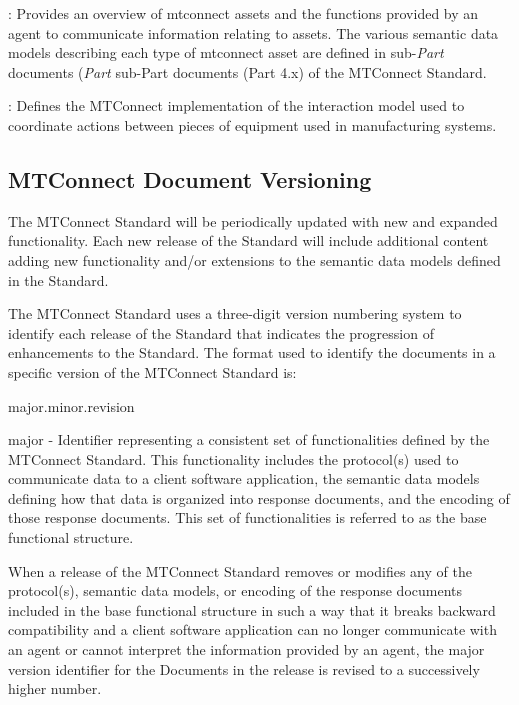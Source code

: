 \documentclass{mtconnect}	%
\providecommand{\DIFadd}[1]{{\hspace{0pt}\protect\color{blue}#1}} %
\providecommand{\DIFdel}[1]{{\hspace{0pt}\protect\color{red}#1}}                      %
\providecommand{\DIFaddbegin}{} %
\providecommand{\DIFaddend}{} %
\providecommand{\DIFdelbegin}{} %
\providecommand{\DIFdelend}{} %
\begin{document}
:  Provides an overview of \glspl{mtconnect asset} and the functions provided by an \gls{agent} to communicate information relating to \glspl{asset}.   The various \glspl{semantic data model} describing each type of \gls{mtconnect asset} are defined in \DIFdelbegin \DIFdel{sub-\textit{Part} documents (\textit{Part} }\DIFdelend \DIFaddbegin \DIFadd{sub-Part documents (Part }\DIFaddend 4.x) of the MTConnect Standard.

:  Defines the MTConnect implementation of the \gls{interaction model} used to coordinate actions between pieces of equipment used in manufacturing systems.   

\subsection{MTConnect Document Versioning}

The MTConnect Standard will be periodically updated with new and expanded functionality.  Each new release of the Standard will include additional content adding new functionality and/or extensions to the \glspl{semantic data model} defined in the Standard.

The MTConnect Standard uses a three-digit version numbering system to identify each release of the Standard that indicates the progression of enhancements to the Standard.  The format used to identify the documents in a specific version of the MTConnect Standard is:

\gls{major}.\gls{minor}.\gls{revision}

\gls{major} -  Identifier representing a consistent set of functionalities defined by the MTConnect Standard. This functionality includes the protocol(s) used to communicate data to a client software application, the \glspl{semantic data model} defining how that data is organized into \glspl{response document}, and the encoding of those \glspl{response document}.  This set of functionalities is referred to as the \gls{base functional structure}.

When a release of the MTConnect Standard removes or modifies any of the protocol(s), \glspl{semantic data model}, or encoding of the \glspl{response document} included in the \gls{base functional structure} in such a way that it breaks backward compatibility and a client software application can no longer communicate with an \gls{agent} or cannot interpret the information provided by an \gls{agent}, the \gls{major} version identifier for the Documents in the release is revised to a successively higher number.
\end{document}

